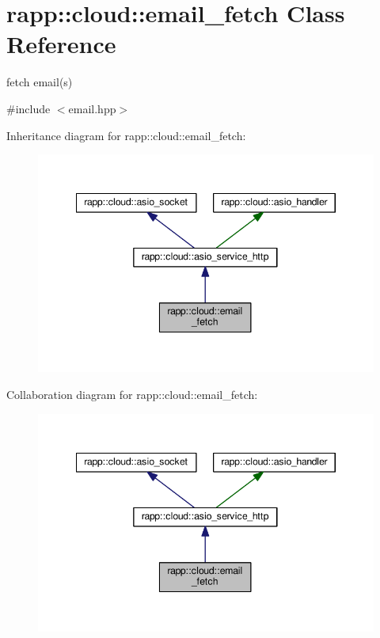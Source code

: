\hypertarget{classrapp_1_1cloud_1_1email__fetch}{\section{rapp\-:\-:cloud\-:\-:email\-\_\-fetch Class Reference}
\label{classrapp_1_1cloud_1_1email__fetch}
}


fetch email(s)  




{\ttfamily \#include $<$email.\-hpp$>$}



Inheritance diagram for rapp\-:\-:cloud\-:\-:email\-\_\-fetch\-:
\nopagebreak
\begin{figure}[H]
\begin{center}
\leavevmode
\includegraphics[width=345pt]{classrapp_1_1cloud_1_1email__fetch__inherit__graph}
\end{center}
\end{figure}


Collaboration diagram for rapp\-:\-:cloud\-:\-:email\-\_\-fetch\-:
\nopagebreak
\begin{figure}[H]
\begin{center}
\leavevmode
\includegraphics[width=345pt]{classrapp_1_1cloud_1_1email__fetch__coll__graph}
\end{center}
\end{figure}
